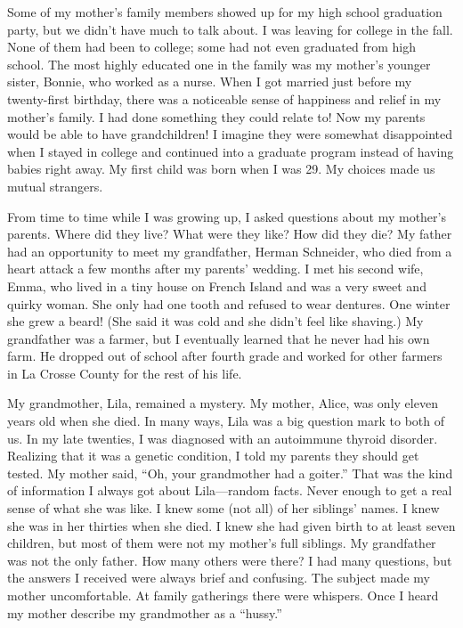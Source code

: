 \documentclass[
  letterpaper,
]{book}
\begin{document}
Some of my mother's family members showed up for my high school
graduation party, but we didn't have much to talk about. I was leaving
for college in the fall. None of them had been to college; some had not
even graduated from high school. The most highly educated one in the
family was my mother's younger sister, Bonnie, who worked as a nurse.
When I got married just before my twenty-first birthday, there was a
noticeable sense of happiness and relief in my mother's family. I had
done something they could relate to! Now my parents would be able to
have grandchildren! I imagine they were somewhat disappointed when I
stayed in college and continued into a graduate program instead of
having babies right away. My first child was born when I was 29. My
choices made us mutual strangers.

From time to time while I was growing up, I asked questions about my
mother's parents. Where did they live? What were they like? How did they
die? My father had an opportunity to meet my grandfather, Herman
Schneider, who died from a heart attack a few months after my parents'
wedding. I met his second wife, Emma, who lived in a tiny house on
French Island and was a very sweet and quirky woman. She only had one
tooth and refused to wear dentures. One winter she grew a beard! (She
said it was cold and she didn't feel like shaving.) My grandfather was a
farmer, but I eventually learned that he never had his own farm. He
dropped out of school after fourth grade and worked for other farmers in
La Crosse County for the rest of his life.

My grandmother, Lila, remained a mystery. My mother, Alice, was only
eleven years old when she died. In many ways, Lila was a big question
mark to both of us. In my late twenties, I was diagnosed with an
autoimmune thyroid disorder. Realizing that it was a genetic condition,
I told my parents they should get tested. My mother said, ``Oh, your
grandmother had a goiter.'' That was the kind of information I always
got about Lila---random facts. Never enough to get a real sense of what
she was like. I knew some (not all) of her siblings' names. I knew she
was in her thirties when she died. I knew she had given birth to at
least seven children, but most of them were not my mother's full
siblings. My grandfather was not the only father. How many others were
there? I had many questions, but the answers I received were always
brief and confusing. The subject made my mother uncomfortable. At family
gatherings there were whispers. Once I heard my mother describe my
grandmother as a ``hussy.''
\end{document}
